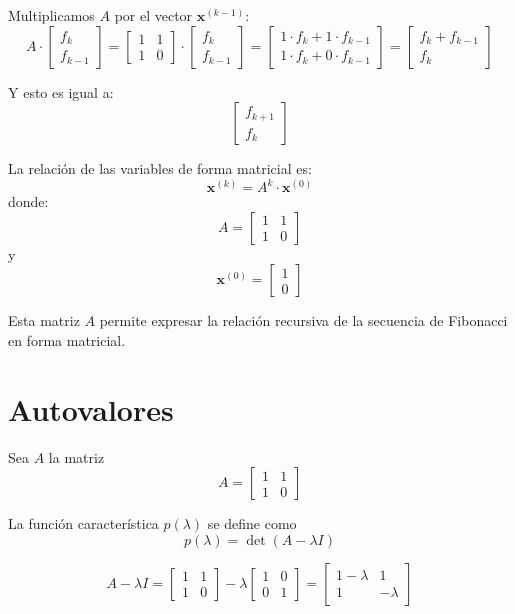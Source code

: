 \documentclass{article}
\begin{document}
Multiplicamos \( A \) por el vector \(\mathbf{x}^{(k-1)}\):
\[
A \cdot \begin{bmatrix}
f_k \\
f_{k-1}
\end{bmatrix}
=
\begin{bmatrix}
1 & 1 \\
1 & 0
\end{bmatrix}
\cdot
\begin{bmatrix}
f_k \\
f_{k-1}
\end{bmatrix}
=
\begin{bmatrix}
1 \cdot f_k + 1 \cdot f_{k-1} \\
1 \cdot f_k + 0 \cdot f_{k-1}
\end{bmatrix}
=
\begin{bmatrix}
f_k + f_{k-1} \\
f_k
\end{bmatrix}
\]

Y esto es igual a:
\[
\begin{bmatrix}
f_{k+1} \\
f_k
\end{bmatrix}
\]

La relación de las variables de forma matricial es:
\[
\mathbf{x}^{(k)} = A^k \cdot \mathbf{x}^{(0)}
\]
donde:
\[
A = \begin{bmatrix}
1 & 1 \\
1 & 0
\end{bmatrix}
\]
y
\[
\mathbf{x}^{(0)} = \begin{bmatrix}
1 \\
0
\end{bmatrix}
\]

Esta matriz \( A \) permite expresar la relación recursiva de la secuencia de Fibonacci en forma matricial.


\section*{Autovalores}

Sea \( A \) la matriz
\[
A = \begin{bmatrix}
1 & 1 \\
1 & 0
\end{bmatrix}
\]

La función característica \( p(\lambda) \) se define como
\[
p(\lambda) = \det (A - \lambda I)
\]

\[
A - \lambda I = \begin{bmatrix}
1 & 1 \\
1 & 0
\end{bmatrix} - \lambda \begin{bmatrix}
1 & 0 \\
0 & 1
\end{bmatrix} = \begin{bmatrix}
1 - \lambda & 1 \\
1 & -\lambda
\end{bmatrix}
\]
\end{document}
